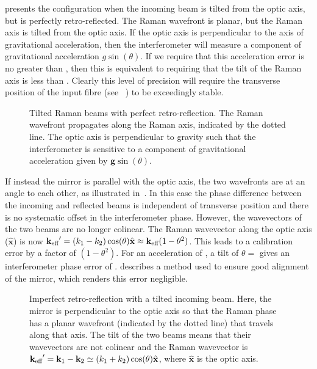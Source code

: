 presents the configuration when the incoming beam is tilted from the
optic axis, but is perfectly retro-reflected. The Raman wavefront is
planar, but the Raman axis is tilted from the optic axis. If the optic
axis is perpendicular to the axis of gravitational
acceleration, then the interferometer will measure a component of
gravitational acceleration $g \sin(\theta)$. If we require that this
acceleration error is no greater than , then
this is equivalent to requiring that the tilt of the Raman axis is
less than . Clearly this level of
precision will require the transverse position of the input fibre 
(see ~) to be exceedingly
stable.
\begin{figure}[!htbp]
	\centering
  \fontsize{12pt}{12pt}
  \resizebox{0.5\textwidth}{!}{}
	\caption[Tilted Raman beams with perfect retro-reflection.]{Tilted
  Raman beams with perfect retro-reflection. The Raman wavefront
propagates along the Raman axis, indicated by the dotted line. The
optic axis is perpendicular to gravity such that the interferometer is
sensitive to a component of gravitational acceleration given by
$\textbf{g} \sin(\theta)$.}\label{fig:perfect_retro}
\end{figure}
\par\noindent
If instead the mirror is parallel with the optic axis, the two
wavefronts are at an angle to each other, as illustrated
in~. In this case the phase difference
between the incoming and reflected beams is independent of transverse
position and there is no systematic offset in the interferometer
phase. However, the wavevectors of the
two beams are no longer colinear. The Raman wavevector along the optic axis
($\hat{\textbf{x}}$)
is now ${\textbf k_\textnormal{eff}}' =
(k_1-k_2)\cos(\theta)\hat{\textbf{x}} \approx  {\textbf k_\textnormal{eff}} (1-\theta^2)$. This leads to a
calibration error by a factor of $(1-\theta^2)$. For an
acceleration of , a tilt
of $\theta = $  gives an interferometer
phase error of .  describes a method
used to ensure good alignment of the mirror, which
renders this error negligible.
\begin{figure}[htpb]
  \centering
  \fontsize{12pt}{12pt}
  \resizebox{0.5\textwidth}{!}{}
  \caption[Imperfect retro-reflection with a tilted incoming beam.
  ]{Imperfect retro-reflection with a tilted incoming beam.
  Here, the mirror is perpendicular to the optic axis so that the
Raman phase has a planar wavefront (indicated by the dotted line) that
travels along that axis. The tilt of the two beams means that their
wavevectors are not colinear and the Raman wavevector is ${\textbf k_\textnormal{eff}}' =
\textbf{k}_1 - \textbf{k}_2 \simeq
(k_1+k_2)\cos(\theta)\hat{\textbf{x}}$, where $\hat{\textbf{x}}$ is
the optic axis.}
  \label{fig:imperfect_retro}
\end{figure}
